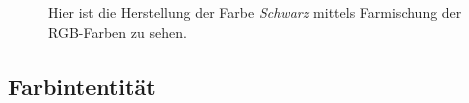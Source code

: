 \documentclass[11pt]{article}
\begin{document}
{\begin{minipage}[t]{0.6\textwidth}
\begin{figure}[H]
\caption{Hier ist die Herstellung der Farbe \textit{Schwarz} mittels Farmischung der RGB-Farben zu sehen.}
\label{schwarzmix}
\end{figure}
\end{minipage}  }



\subsection{Farbintentität}
\end{document}

